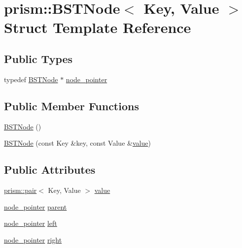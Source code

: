 \hypertarget{structprism_1_1_b_s_t_node}{}\section{prism\+:\+:B\+S\+T\+Node$<$ Key, Value $>$ Struct Template Reference}
\label{structprism_1_1_b_s_t_node}
\subsection*{Public Types}
\begin{DoxyCompactItemize}
\item 
typedef \hyperlink{structprism_1_1_b_s_t_node}{B\+S\+T\+Node} $\ast$ \hyperlink{structprism_1_1_b_s_t_node_ab7dc1c7c13746f72ca849689b37f7ba9}{node\+\_\+pointer}
\end{DoxyCompactItemize}
\subsection*{Public Member Functions}
\begin{DoxyCompactItemize}
\item 
\hyperlink{structprism_1_1_b_s_t_node_ae7b5c23e9c465541e8f8127fcd6adff6}{B\+S\+T\+Node} ()
\item 
\hyperlink{structprism_1_1_b_s_t_node_a3a102e04479ebfe4359bbbbaf4e468ac}{B\+S\+T\+Node} (const Key \&key, const Value \&\hyperlink{structprism_1_1_b_s_t_node_aee53d06b367f8861e13c8857301b9d4d}{value})
\end{DoxyCompactItemize}
\subsection*{Public Attributes}
\begin{DoxyCompactItemize}
\item 
\hyperlink{structprism_1_1pair}{prism\+::pair}$<$ Key, Value $>$ \hyperlink{structprism_1_1_b_s_t_node_aee53d06b367f8861e13c8857301b9d4d}{value}
\item 
\hyperlink{structprism_1_1_b_s_t_node_ab7dc1c7c13746f72ca849689b37f7ba9}{node\+\_\+pointer} \hyperlink{structprism_1_1_b_s_t_node_a7d52cc6b076a5745f5e20eb2582a8823}{parent}
\item 
\hyperlink{structprism_1_1_b_s_t_node_ab7dc1c7c13746f72ca849689b37f7ba9}{node\+\_\+pointer} \hyperlink{structprism_1_1_b_s_t_node_a3d97dd7eb80c576ddc2004c03da6a85a}{left}
\item 
\hyperlink{structprism_1_1_b_s_t_node_ab7dc1c7c13746f72ca849689b37f7ba9}{node\+\_\+pointer} \hyperlink{structprism_1_1_b_s_t_node_a4d29a1dc9bcb5f6fb5b73e0bdfc1ace0}{right}
\end{DoxyCompactItemize}


